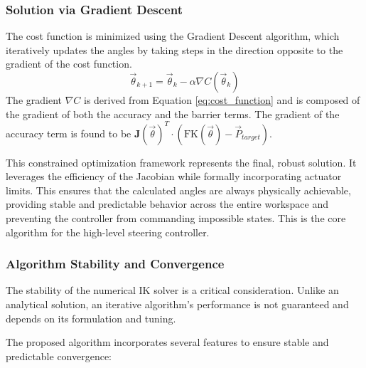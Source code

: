 \documentclass[12pt]{article}
\begin{document}
\subsubsection{Solution via Gradient Descent}
The cost function is minimized using the Gradient Descent algorithm, which iteratively updates the angles by taking steps in the direction opposite to the gradient of the cost function.
\begin{equation}
\vec{\theta}_{k+1} = \vec{\theta}_k - \alpha \nabla C(\vec{\theta}_k)
\end{equation}
The gradient \(\nabla C\) is derived from Equation \ref{eq:cost_function} and is composed of the gradient of both the accuracy and the barrier terms. The gradient of the accuracy term is found to be \(\mathbf{J}(\vec{\theta})^T \cdot (\text{FK}(\vec{\theta}) - \vec{P}_{target})\).

\vspace*{0.5cm}

This constrained optimization framework represents the final, robust solution. It leverages the efficiency of the Jacobian while formally incorporating actuator limits. This ensures that the calculated angles are always physically achievable, providing stable and predictable behavior across the entire workspace and preventing the controller from commanding impossible states. This is the core algorithm for the high-level steering controller.

\subsubsection{Algorithm Stability and Convergence}

The stability of the numerical IK solver is a critical consideration. Unlike an analytical solution, an iterative algorithm's performance is not guaranteed and depends on its formulation and tuning.

The proposed algorithm incorporates several features to ensure stable and predictable convergence:
\end{document}
